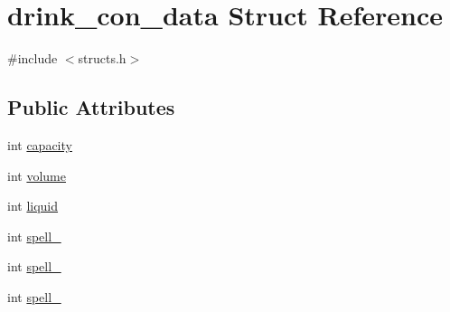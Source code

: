 \hypertarget{structdrink__con__data}{\section{drink\-\_\-con\-\_\-data Struct Reference}
\label{structdrink__con__data}
}


{\ttfamily \#include $<$structs.\-h$>$}

\subsection*{Public Attributes}
\begin{DoxyCompactItemize}
\item 
int \hyperlink{structdrink__con__data_a5cac33a25d1cc68b4dac27ade406d684}{capacity}
\item 
int \hyperlink{structdrink__con__data_a686fd202bd3b635278f013bbdc669f4a}{volume}
\item 
int \hyperlink{structdrink__con__data_ac33a72581f93b7bad80f3ae33d4ef68c}{liquid}
\item 
int \hyperlink{structdrink__con__data_af5145a4345372041e57348562a4bd430}{spell\-\_}
\item 
int \hyperlink{structdrink__con__data_a8df8caa469e72817b444d23562ba7a26}{spell\-\_}
\item 
int \hyperlink{structdrink__con__data_ac605d28a87025e7578866f9772cb3509}{spell\-\_}
\end{DoxyCompactItemize}


